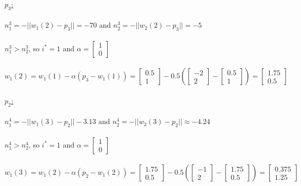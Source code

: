 \documentclass{article}
\begin{document}
\newpage
\noindent\underline{$p_3$:} \\\\$n_1^3 = -||w_1(2)-p_3|| = -70$ and $n_2^3 = -||w_2(2)-p_3|| = -5$ \\\\
$n_1^3 > n_2^3$, so $i^{*} = 1$ and $\alpha = \begin{bmatrix}
  1\\ 
  0
\end{bmatrix}$ \\\\ $w_1(2)=w_1(1) - \alpha(p_3-w_1(1)) = \begin{bmatrix}
  0.5 \\
  1
\end{bmatrix} - 0.5 (\begin{bmatrix}
  -2\\
  2
\end{bmatrix} - \begin{bmatrix}
  0.5\\
  1
\end{bmatrix}) =  \begin{bmatrix}
  1.75\\
  0.5
\end{bmatrix}$
\\\\ \underline{$p_2$:} \\\\$n_1^4 = -||w_1(3)-p_2|| -3.13$ and $n_2^4 = -||w_2(3)-p_2|| \approx -4.24$ \\\\
$n_1^4 > n_2^4$, so $i^{*} = 1$ and $\alpha = \begin{bmatrix}
  1\\ 
  0
\end{bmatrix}$ \\\\ $w_1(3)=w_1(2) - \alpha(p_2-w_1(2)) = \begin{bmatrix}
  1.75 \\
  0.5
\end{bmatrix} - 0.5 (\begin{bmatrix}
  -1\\
  2
\end{bmatrix} - \begin{bmatrix}
  1.75\\
  0.5
\end{bmatrix}) =  \begin{bmatrix}
  0.375\\
  1.25
\end{bmatrix}$
\end{document}
